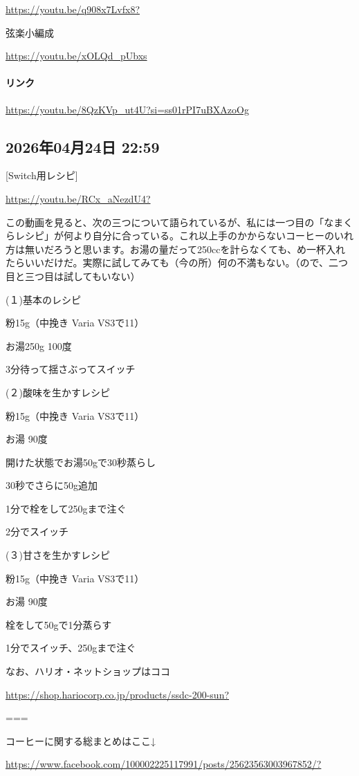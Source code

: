 \url{https://youtu.be/q908x7Lvfx8?}

弦楽小編成

\url{https://youtu.be/xOLQd_pUbxs}

\paragraph{リンク}
\url{https://youtu.be/8QzKVp_ut4U?si=ss01rPI7uBXAzoOg}

\subsection*{2026年04月24日 22:59}

[Switch用レシピ]

\url{https://youtu.be/RCx_aNezdU4?}

この動画を見ると、次の三つについて語られているが、私には一つ目の「なまくらレシピ」が何より自分に合っている。これ以上手のかからないコーヒーのいれ方は無いだろうと思います。お湯の量だって250ccを計らなくても、め一杯入れたらいいだけだ。実際に試してみても（今の所）何の不満もない。（ので、二つ目と三つ目は試してもいない）

(１)基本のレシピ

粉15g（中挽き Varia VS3で11）

お湯250g 100度

3分待って揺さぶってスイッチ

(２)酸味を生かすレシピ

粉15g（中挽き Varia VS3で11）

お湯 90度

開けた状態でお湯50gで30秒蒸らし

30秒でさらに50g追加

1分で栓をして250gまで注ぐ

2分でスイッチ

(３)甘さを生かすレシピ

粉15g（中挽き Varia VS3で11）

お湯 90度

栓をして50gで1分蒸らす

1分でスイッチ、250gまで注ぐ

なお、ハリオ・ネットショップはココ

\url{https://shop.hariocorp.co.jp/products/ssdc-200-sun?}

===

コーヒーに関する総まとめはここ↓

\url{https://www.facebook.com/100002225117991/posts/25623563003967852/?}

